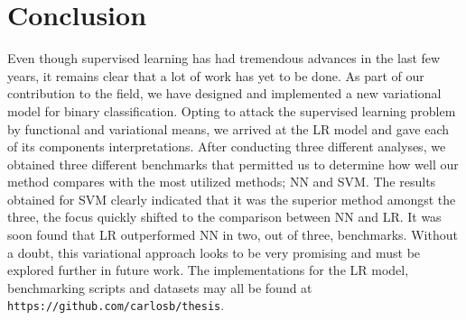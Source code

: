 \documentclass{INGUADY}
\begin{document}
\section{Conclusion}
Even though supervised learning has had tremendous advances in the last few years, it remains clear that a lot of work has yet to be done. 
As part of our contribution to the field, we have designed and implemented a new variational model for binary classification. Opting to attack the supervised learning problem by functional and variational means, we arrived at the LR model and gave each of its components interpretations. 
After conducting three different analyses, we obtained three different benchmarks that permitted us to determine how well our method compares with the most utilized methods; NN and SVM. 
The results obtained for SVM clearly indicated that it was the superior method amongst the three, the focus quickly shifted to the comparison between NN and LR. It was soon found that LR outperformed NN in two, out of three, benchmarks. Without a doubt, this variational approach looks to be very promising and must be explored further in future work.
The implementations for the LR model, benchmarking scripts and datasets may all be found at \texttt{https://github.com/carlosb/thesis}.

\onecolumn 
\end{document}
